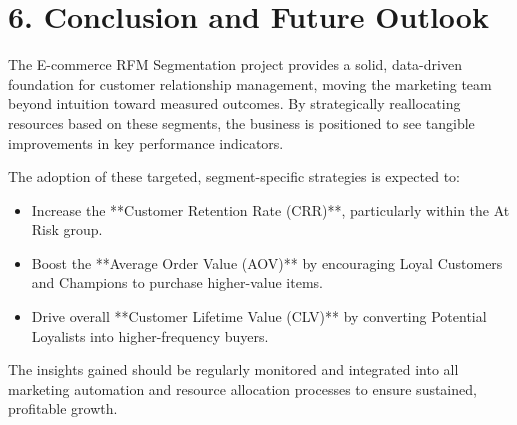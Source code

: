 \documentclass{article}
\begin{document}
\section*{6. Conclusion and Future Outlook}
The E-commerce RFM Segmentation project provides a solid, data-driven foundation for customer relationship management, moving the marketing team beyond intuition toward measured outcomes. By strategically reallocating resources based on these segments, the business is positioned to see tangible improvements in key performance indicators.

The adoption of these targeted, segment-specific strategies is expected to:
\begin{itemize}
    \item Increase the **Customer Retention Rate (CRR)**, particularly within the At Risk group.
    \item Boost the **Average Order Value (AOV)** by encouraging Loyal Customers and Champions to purchase higher-value items.
    \item Drive overall **Customer Lifetime Value (CLV)** by converting Potential Loyalists into higher-frequency buyers.
\end{itemize}
The insights gained should be regularly monitored and integrated into all marketing automation and resource allocation processes to ensure sustained, profitable growth.
\end{document}
